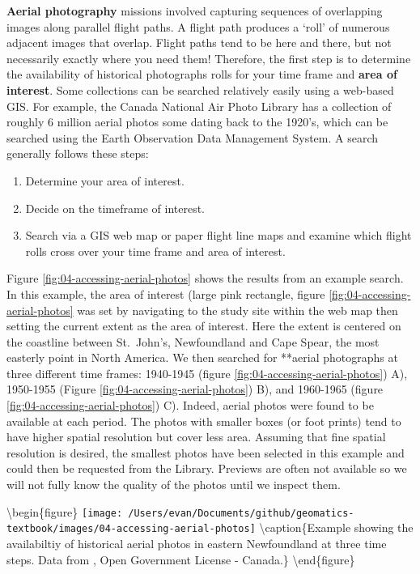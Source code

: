 \documentclass[
]{book}
\providecommand{\tightlist}{%
  \setlength{\itemsep}{0pt}\setlength{\parskip}{0pt}}
\begin{document}
\textbf{Aerial photography} missions involved capturing sequences of overlapping images along parallel flight paths. A flight path produces a `roll' of numerous adjacent images that overlap. Flight paths tend to be here and there, but not necessarily exactly where you need them! Therefore, the first step is to determine the availability of historical photographs rolls for your time frame and \textbf{area of interest}. Some collections can be searched relatively easily using a web-based GIS. For example, the Canada National Air Photo Library has a collection of roughly 6 million aerial photos some dating back to the 1920's, which can be searched using the Earth Observation Data Management System. A search generally follows these steps:

\begin{enumerate}
\def\labelenumi{\arabic{enumi}.}
\tightlist
\item
  Determine your area of interest.
\item
  Decide on the timeframe of interest.
\item
  Search via a GIS web map or paper flight line maps and examine which flight rolls cross over your time frame and area of interest.
\end{enumerate}

Figure \ref{fig:04-accessing-aerial-photos} shows the results from an example search. In this example, the area of interest (large pink rectangle, figure \ref{fig:04-accessing-aerial-photos} was set by navigating to the study site within the web map then setting the current extent as the area of interest. Here the extent is centered on the coastline between St.~John's, Newfoundland and Cape Spear, the most easterly point in North America. We then searched for **aerial photographs at three different time frames: 1940-1945 (figure \ref{fig:04-accessing-aerial-photos}) A), 1950-1955 (Figure \ref{fig:04-accessing-aerial-photos}) B), and 1960-1965 (figure \ref{fig:04-accessing-aerial-photos}) C). Indeed, aerial photos were found to be available at each period. The photos with smaller boxes (or foot prints) tend to have higher spatial resolution but cover less area. Assuming that fine spatial resolution is desired, the smallest photos have been selected in this example and could then be requested from the Library. Previews are often not available so we will not fully know the quality of the photos until we inspect them.

\textbackslash begin\{figure\}
\texttt{[image: /Users/evan/Documents/github/geomatics-textbook/images/04-accessing-aerial-photos]} \textbackslash caption\{Example showing the availabiltiy of historical aerial photos in eastern Newfoundland at three time steps. Data from \citet{natural_resources_canada_earth_nodate}, Open Government License - Canada.\}\label{fig:04-accessing-aerial-photos}
\textbackslash end\{figure\}
\end{document}
